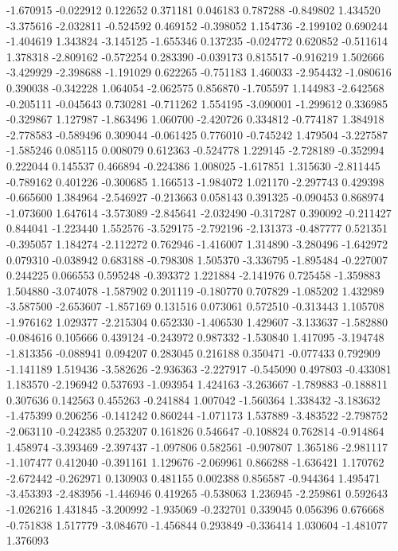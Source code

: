 -1.670915
-0.022912
0.122652
0.371181
0.046183
0.787288
-0.849802
1.434520
-3.375616
-2.032811
-0.524592
0.469152
-0.398052
1.154736
-2.199102
0.690244
-1.404619
1.343824
-3.145125
-1.655346
0.137235
-0.024772
0.620852
-0.511614
1.378318
-2.809162
-0.572254
0.283390
-0.039173
0.815517
-0.916219
1.502666
-3.429929
-2.398688
-1.191029
0.622265
-0.751183
1.460033
-2.954432
-1.080616
0.390038
-0.342228
1.064054
-2.062575
0.856870
-1.705597
1.144983
-2.642568
-0.205111
-0.045643
0.730281
-0.711262
1.554195
-3.090001
-1.299612
0.336985
-0.329867
1.127987
-1.863496
1.060700
-2.420726
0.334812
-0.774187
1.384918
-2.778583
-0.589496
0.309044
-0.061425
0.776010
-0.745242
1.479504
-3.227587
-1.585246
0.085115
0.008079
0.612363
-0.524778
1.229145
-2.728189
-0.352994
0.222044
0.145537
0.466894
-0.224386
1.008025
-1.617851
1.315630
-2.811445
-0.789162
0.401226
-0.300685
1.166513
-1.984072
1.021170
-2.297743
0.429398
-0.665600
1.384964
-2.546927
-0.213663
0.058143
0.391325
-0.090453
0.868974
-1.073600
1.647614
-3.573089
-2.845641
-2.032490
-0.317287
0.390092
-0.211427
0.844041
-1.223440
1.552576
-3.529175
-2.792196
-2.131373
-0.487777
0.521351
-0.395057
1.184274
-2.112272
0.762946
-1.416007
1.314890
-3.280496
-1.642972
0.079310
-0.038942
0.683188
-0.798308
1.505370
-3.336795
-1.895484
-0.227007
0.244225
0.066553
0.595248
-0.393372
1.221884
-2.141976
0.725458
-1.359883
1.504880
-3.074078
-1.587902
0.201119
-0.180770
0.707829
-1.085202
1.432989
-3.587500
-2.653607
-1.857169
0.131516
0.073061
0.572510
-0.313443
1.105708
-1.976162
1.029377
-2.215304
0.652330
-1.406530
1.429607
-3.133637
-1.582880
-0.084616
0.105666
0.439124
-0.243972
0.987332
-1.530840
1.417095
-3.194748
-1.813356
-0.088941
0.094207
0.283045
0.216188
0.350471
-0.077433
0.792909
-1.141189
1.519436
-3.582626
-2.936363
-2.227917
-0.545090
0.497803
-0.433081
1.183570
-2.196942
0.537693
-1.093954
1.424163
-3.263667
-1.789883
-0.188811
0.307636
0.142563
0.455263
-0.241884
1.007042
-1.560364
1.338432
-3.183632
-1.475399
0.206256
-0.141242
0.860244
-1.071173
1.537889
-3.483522
-2.798752
-2.063110
-0.242385
0.253207
0.161826
0.546647
-0.108824
0.762814
-0.914864
1.458974
-3.393469
-2.397437
-1.097806
0.582561
-0.907807
1.365186
-2.981117
-1.107477
0.412040
-0.391161
1.129676
-2.069961
0.866288
-1.636421
1.170762
-2.672442
-0.262971
0.130903
0.481155
0.002388
0.856587
-0.944364
1.495471
-3.453393
-2.483956
-1.446946
0.419265
-0.538063
1.236945
-2.259861
0.592643
-1.026216
1.431845
-3.200992
-1.935069
-0.232701
0.339045
0.056396
0.676668
-0.751838
1.517779
-3.084670
-1.456844
0.293849
-0.336414
1.030604
-1.481077
1.376093
